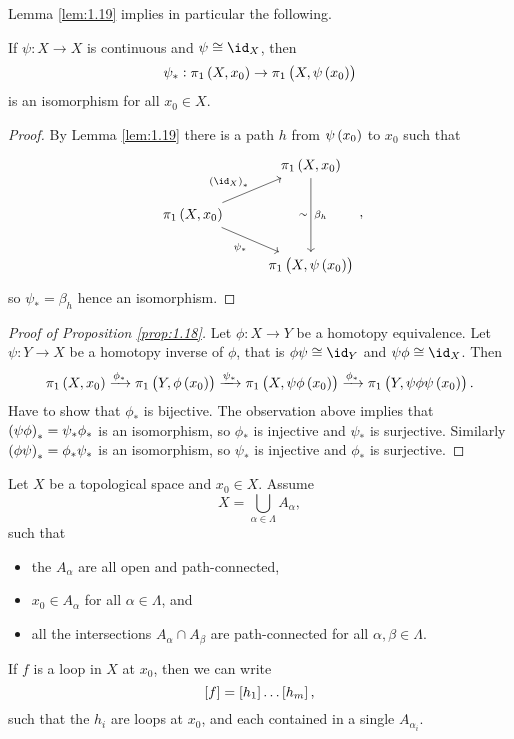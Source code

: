 Lemma \ref{lem:1.19} implies in particular the following.

\begin{corollary}
If $ \psi : X \to X $ is continuous and $ \psi \cong \id_X $, then
$$ \psi_* : \pi_1\br{X, x_0} \to \pi_1\br{X, \psi\br{x_0}} $$
is an isomorphism for all $ x_0 \in X $.
\end{corollary}

\begin{proof}
By Lemma \ref{lem:1.19} there is a path $ h $ from $ \psi\br{x_0} $ to $ x_0 $ such that
$$
\begin{tikzcd}
& \pi_1\br{X, x_0} \arrow{dd}{\beta_h}[swap]{\sim} \\
\pi_1\br{X, x_0} \arrow{ur}{\br{\id_X}_*} \arrow[swap]{dr}{\psi_*} & \\
& \pi_1\br{X, \psi\br{x_0}}
\end{tikzcd},
$$
so $ \psi_* = \beta_h $ hence an isomorphism.
\end{proof}

\pagebreak

\begin{proof}[Proof of Proposition \ref{prop:1.18}]
Let $ \phi : X \to Y $ be a homotopy equivalence. Let $ \psi : Y \to X $ be a homotopy inverse of $ \phi $, that is $ \phi\psi \cong \id_Y $ and $ \psi\phi \cong \id_X $. Then
$$ \pi_1\br{X, x_0} \xrightarrow{\phi_*} \pi_1\br{Y, \phi\br{x_0}} \xrightarrow{\psi_*} \pi_1\br{X, \psi\phi\br{x_0}} \xrightarrow{\phi_*} \pi_1\br{Y, \psi\phi\psi\br{x_0}}. $$
Have to show that $ \phi_* $ is bijective. The observation above implies that $ \br{\psi\phi}_* = \psi_*\phi_* $ is an isomorphism, so $ \phi_* $ is injective and $ \psi_* $ is surjective. Similarly $ \br{\phi\psi}_* = \phi_*\psi_* $ is an isomorphism, so $ \psi_* $ is injective and $ \phi_* $ is surjective.
\end{proof}

\begin{lemma}
\label{lem:1.15}
Let $ X $ be a topological space and $ x_0 \in X $. Assume
$$ X = \bigcup_{\alpha \in \Lambda} A_\alpha, $$
such that
\begin{itemize}
\item the $ A_\alpha $ are all open and path-connected,
\item $ x_0 \in A_\alpha $ for all $ \alpha \in \Lambda $, and
\item all the intersections $ A_\alpha \cap A_\beta $ are path-connected for all $ \alpha, \beta \in \Lambda $.
\end{itemize}
If $ f $ is a loop in $ X $ at $ x_0 $, then we can write
$$ \sbr{f} = \sbr{h_1} \dots \sbr{h_m}, $$
such that the $ h_i $ are loops at $ x_0 $, and each contained in a single $ A_{\alpha_i} $.
\end{lemma}


